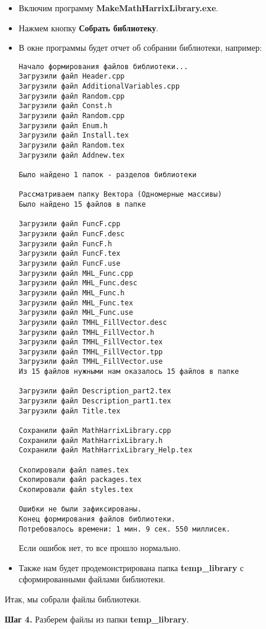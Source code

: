 \documentclass[a4paper,12pt]{article}
\begin{document}
\begin{itemize}
\item Включим программу \textbf{MakeMathHarrixLibrary.exe}.
\item Нажмем кнопку \textbf{Собрать библиотеку}.
\item В окне программы будет отчет об собрании библиотеки, например:
\begin{lstlisting}[label=examplereport, caption=Пример отчета о сборке библиотеки]
Начало формирования файлов библиотеки...
Загрузили файл Header.cpp
Загрузили файл AdditionalVariables.cpp
Загрузили файл Random.cpp
Загрузили файл Const.h
Загрузили файл Random.cpp
Загрузили файл Enum.h
Загрузили файл Install.tex
Загрузили файл Random.tex
Загрузили файл Addnew.tex

Было найдено 1 папок - разделов библиотеки

Рассматриваем папку Вектора (Одномерные массивы)
Было найдено 15 файлов в папке

Загрузили файл FuncF.cpp
Загрузили файл FuncF.desc
Загрузили файл FuncF.h
Загрузили файл FuncF.tex
Загрузили файл FuncF.use
Загрузили файл MHL_Func.cpp
Загрузили файл MHL_Func.desc
Загрузили файл MHL_Func.h
Загрузили файл MHL_Func.tex
Загрузили файл MHL_Func.use
Загрузили файл TMHL_FillVector.desc
Загрузили файл TMHL_FillVector.h
Загрузили файл TMHL_FillVector.tex
Загрузили файл TMHL_FillVector.tpp
Загрузили файл TMHL_FillVector.use
Из 15 файлов нужными нам оказалось 15 файлов в папке

Загрузили файл Description_part2.tex
Загрузили файл Description_part1.tex
Загрузили файл Title.tex

Сохранили файл MathHarrixLibrary.cpp
Сохранили файл MathHarrixLibrary.h
Сохранили файл MathHarrixLibrary_Help.tex

Скопировали файл names.tex
Скопировали файл packages.tex
Скопировали файл styles.tex

Ошибки не были зафиксированы.
Конец формирования файлов библиотеки.
Потребовалось времени: 1 мин. 9 сек. 550 миллисек.
\end{lstlisting}

Если ошибок нет, то все прошло нормально.
\item Также нам будет продемонстрирована папка \textbf{temp\_library} с сформированными файлами библиотеки.
\end{itemize}

Итак, мы собрали файлы библиотеки.

\textbf{Шаг 4.}\label{step4} Разберем файлы из папки \textbf{temp\_library}.
\end{document}
